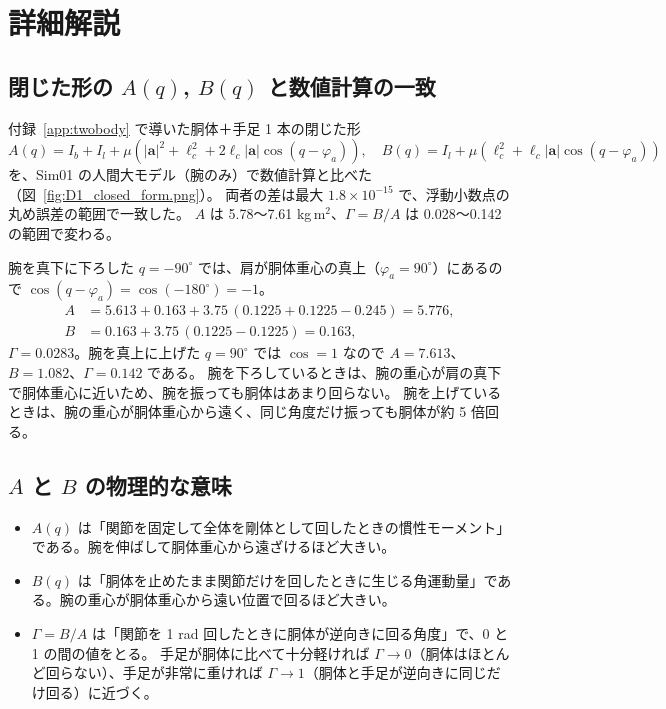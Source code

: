 \section{詳細解説}

\subsection{閉じた形の $A(q)$, $B(q)$ と数値計算の一致}

付録~\ref{app:twobody} で導いた胴体＋手足 1 本の閉じた形
\[
A(q) = I_b + I_l + \mu\left(|\bm a|^2+\ell_c^2+2\ell_c|\bm a|\cos(q-\varphi_a)\right),\quad
B(q) = I_l + \mu\left(\ell_c^2+\ell_c|\bm a|\cos(q-\varphi_a)\right)
\]
を、Sim01 の人間大モデル（腕のみ）で数値計算と比べた（図~\ref{fig:D1_closed_form.png}）。
両者の差は最大 $1.8\times10^{-15}$ で、浮動小数点の丸め誤差の範囲で一致した。
$A$ は 5.78〜7.61 kg\,m$^2$、$\Gamma=B/A$ は 0.028〜0.142 の範囲で変わる。


\begin{example}
腕を真下に下ろした $q=-90^\circ$ では、肩が胴体重心の真上（$\varphi_a=90^\circ$）にあるので $\cos(q-\varphi_a)=\cos(-180^\circ)=-1$。
\begin{align*}
A &= 5.613 + 0.163 + 3.75\,(0.1225+0.1225-0.245) = 5.776,\\
B &= 0.163 + 3.75\,(0.1225-0.1225) = 0.163 ,
\end{align*}
$\Gamma = 0.0283$。腕を真上に上げた $q=90^\circ$ では $\cos=1$ なので $A=7.613$、$B=1.082$、$\Gamma=0.142$ である。
腕を下ろしているときは、腕の重心が肩の真下で胴体重心に近いため、腕を振っても胴体はあまり回らない。
腕を上げているときは、腕の重心が胴体重心から遠く、同じ角度だけ振っても胴体が約 5 倍回る。
\end{example}

\subsection{$A$ と $B$ の物理的な意味}

\begin{itemize}
\item $A(q)$ は「関節を固定して全体を剛体として回したときの慣性モーメント」である。腕を伸ばして胴体重心から遠ざけるほど大きい。
\item $B(q)$ は「胴体を止めたまま関節だけを回したときに生じる角運動量」である。腕の重心が胴体重心から遠い位置で回るほど大きい。
\item $\Gamma = B/A$ は「関節を 1 rad 回したときに胴体が逆向きに回る角度」で、0 と 1 の間の値をとる。
  手足が胴体に比べて十分軽ければ $\Gamma\to0$（胴体はほとんど回らない）、手足が非常に重ければ $\Gamma\to1$（胴体と手足が逆向きに同じだけ回る）に近づく。
\end{itemize}


